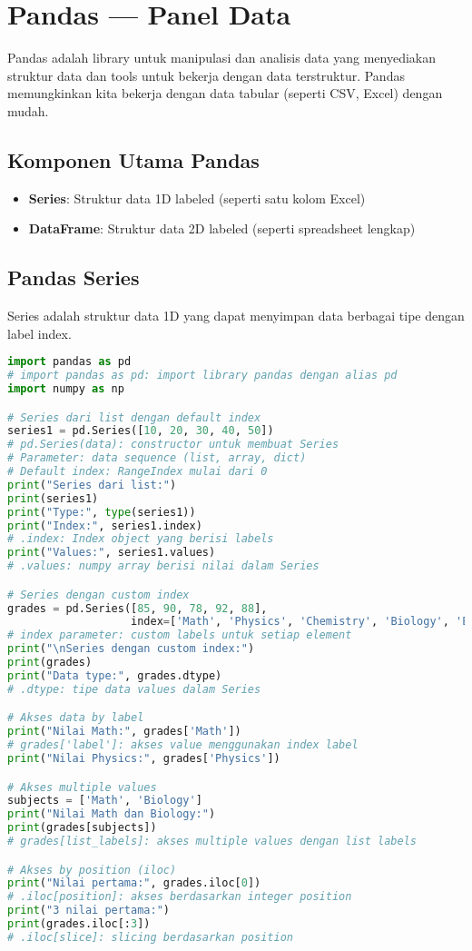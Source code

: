 \section{Pandas — Panel Data}

Pandas adalah library untuk manipulasi dan analisis data yang menyediakan struktur data dan tools untuk bekerja dengan data terstruktur. Pandas memungkinkan kita bekerja dengan data tabular (seperti CSV, Excel) dengan mudah.

\subsection*{Komponen Utama Pandas}
\begin{itemize}
  \item \textbf{Series}: Struktur data 1D labeled (seperti satu kolom Excel)
  \item \textbf{DataFrame}: Struktur data 2D labeled (seperti spreadsheet lengkap)
\end{itemize}

\subsection*{Pandas Series}

Series adalah struktur data 1D yang dapat menyimpan data berbagai tipe dengan label index.

\begin{lstlisting}[language=python, caption={Membuat dan Menggunakan Series}, style=python]
import pandas as pd
# import pandas as pd: import library pandas dengan alias pd
import numpy as np

# Series dari list dengan default index
series1 = pd.Series([10, 20, 30, 40, 50])
# pd.Series(data): constructor untuk membuat Series
# Parameter: data sequence (list, array, dict)
# Default index: RangeIndex mulai dari 0
print("Series dari list:")
print(series1)
print("Type:", type(series1))
print("Index:", series1.index)
# .index: Index object yang berisi labels
print("Values:", series1.values)
# .values: numpy array berisi nilai dalam Series

# Series dengan custom index
grades = pd.Series([85, 90, 78, 92, 88],
                   index=['Math', 'Physics', 'Chemistry', 'Biology', 'English'])
# index parameter: custom labels untuk setiap element
print("\nSeries dengan custom index:")
print(grades)
print("Data type:", grades.dtype)
# .dtype: tipe data values dalam Series

# Akses data by label
print("Nilai Math:", grades['Math'])
# grades['label']: akses value menggunakan index label
print("Nilai Physics:", grades['Physics'])

# Akses multiple values
subjects = ['Math', 'Biology']
print("Nilai Math dan Biology:")
print(grades[subjects])
# grades[list_labels]: akses multiple values dengan list labels

# Akses by position (iloc)
print("Nilai pertama:", grades.iloc[0])
# .iloc[position]: akses berdasarkan integer position
print("3 nilai pertama:")
print(grades.iloc[:3])
# .iloc[slice]: slicing berdasarkan position
\end{lstlisting}

